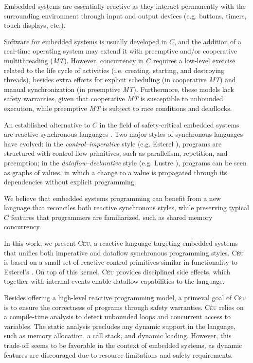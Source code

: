 \documentclass[11pt,a4paper]{article}
\newcommand{\2}{\;\;}
\newcommand{\5}{\;\;\;\;\;}
\newcommand{\CEU}{\textsc{C\'{e}u}}
\begin{document}
Embedded systems are essentially reactive as they interact permanently with the 
surrounding environment through input and output devices (e.g. buttons, timers, 
touch displays, etc.).

Software for embedded systems is usually developed in $C$, and the addition of 
a real-time operating system may extend it with preemptive and/or cooperative 
multithreading (\emph{MT}).
However, concurrency in $C$ requires a low-level exercise related to the life 
cycle of activities (i.e. creating, starting, and destroying threads), besides 
extra efforts for explicit scheduling (in cooperative \emph{MT}) and manual
synchronization (in preemptive \emph{MT}).
Furthermore, these models lack safety warranties, given that 
cooperative \emph{MT} is susceptible to unbounded execution, while 
preemptive \emph{MT} is subject to race conditions and deadlocks.

An established alternative to $C$ in the field of safety-critical embedded 
systems are reactive synchronous languages \cite{rp.twelve}.
Two major styles of synchronous languages have evolved:
in the \emph{control}--\emph{imperative} style (e.g. Esterel 
\cite{esterel.design}), programs are structured with control flow primitives, 
such as parallelism, repetition, and preemption;
in the \emph{dataflow}--\emph{declarative} style (e.g. Lustre 
\cite{lustre.ieee91}), programs can be seen as graphs of values, in which a 
change to a value is propagated through its dependencies without explicit 
programming.

We believe that embedded systems programming can benefit from a new language 
that reconciles both reactive synchronous styles, while preserving typical $C$ 
features that programmers are familiarized, such as shared memory concurrency.

In this work, we present \CEU, a reactive language targeting embedded systems 
that unifies both imperative and dataflow synchronous programming styles.
\CEU{} is based on a small set of reactive control primitives similar in 
functionality to Esterel's \cite{esterel.design}.
On top of this kernel, \CEU{} provides disciplined side effects, which together 
with internal events enable dataflow capabilities to the language.

Besides offering a high-level reactive programming model, a primeval goal of 
\CEU{} is to ensure the correctness of programs through safety warranties.
\CEU{} relies on a compile-time analysis to detect unbounded loops and 
concurrent access to variables.
The static analysis precludes any dynamic support in the language, such as 
memory allocation, a call stack, and dynamic loading.
However, this trade-off seems to be favorable in the context of embedded 
systems, as dynamic features are discouraged due to resource limitations and 
safety requirements.
\end{document}
